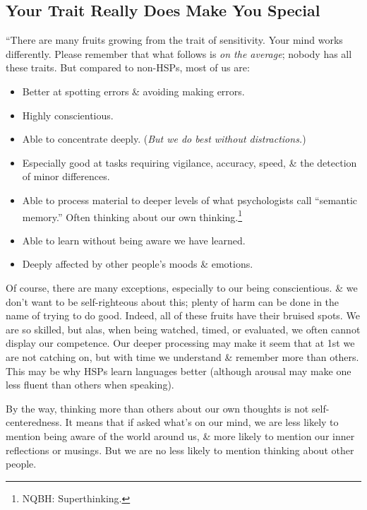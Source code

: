 \documentclass{article}
\numberwithin{equation}{section}
\begin{document}
\subsection{Your Trait Really Does Make You Special}
``There are many fruits growing from the trait of sensitivity. Your mind works differently. Please remember that what follows is \textit{on the average}; nobody has all these traits. But compared to non-HSPs, most of us are:
\begin{itemize}
	\item Better at spotting errors \& avoiding making errors.
	\item Highly conscientious.
	\item Able to concentrate deeply. (\textit{But we do best without distractions.})
	\item Especially good at tasks requiring vigilance, accuracy, speed, \& the detection of minor differences.
	\item Able to process material to deeper levels of what psychologists call ``semantic memory.'' Often thinking about our own thinking.\footnote{NQBH: Superthinking.}
	\item Able to learn without being aware we have learned.
	\item Deeply affected by other people's moods \& emotions.
\end{itemize}
Of course, there are many exceptions, especially to our being conscientious. \& we don't want to be self-righteous about this; plenty of harm can be done in the name of trying to do good. Indeed, all of these fruits have their bruised spots. We are so skilled, but alas, when being watched, timed, or evaluated, we often cannot display our competence. Our deeper processing may make it seem that at 1st we are not catching on, but with time we understand \& remember more than others. This may be why HSPs learn languages better (although arousal may make one less fluent than others when speaking).

By the way, thinking more than others about our own thoughts is not self-centeredness. It means that if asked what's on our mind, we are less likely to mention being aware of the world around us, \& more likely to mention our inner reflections or musings. But we are no less likely to mention thinking about other people.
\end{document}
